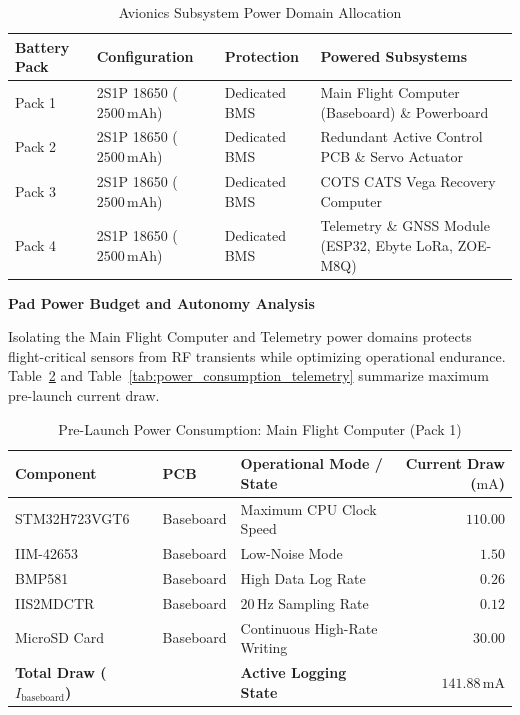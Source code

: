 \documentclass[11pt, a4paper]{article} %
\begin{document}
\begin{table}[H]
\centering
\caption{Avionics Subsystem Power Domain Allocation}
\label{tab:power_domains}
\begin{tabularx}{\textwidth}{l l l X}
\toprule
\textbf{Battery Pack} & \textbf{Configuration} & \textbf{Protection} & \textbf{Powered Subsystems} \\
\midrule
Pack 1 & 2S1P 18650 ($2500\,\text{mAh}$) & Dedicated BMS & Main Flight Computer (Baseboard) \& Powerboard \\
Pack 2 & 2S1P 18650 ($2500\,\text{mAh}$) & Dedicated BMS & Redundant Active Control PCB \& Servo Actuator \\
Pack 3 & 2S1P 18650 ($2500\,\text{mAh}$) & Dedicated BMS & COTS CATS Vega Recovery Computer \\
Pack 4 & 2S1P 18650 ($2500\,\text{mAh}$) & Dedicated BMS & Telemetry \& GNSS Module (ESP32, Ebyte LoRa, ZOE-M8Q) \\
\bottomrule
\end{tabularx}
\end{table}

\vspace{0.5em}
\noindent\textbf{Pad Power Budget and Autonomy Analysis}

Isolating the Main Flight Computer and Telemetry power domains protects flight-critical sensors from RF transients while optimizing operational endurance. Table~\ref{tab:power_consumption_baseboard} and Table~\ref{tab:power_consumption_telemetry} summarize maximum pre-launch current draw.

\begin{table}[H]
\centering
\caption{Pre-Launch Power Consumption: Main Flight Computer (Pack 1)}
\label{tab:power_consumption_baseboard}
\begin{tabularx}{\textwidth}{l l X r}
\toprule
\textbf{Component} & \textbf{PCB} & \textbf{Operational Mode / State} & \textbf{Current Draw ($\text{mA}$)} \\
\midrule
STM32H723VGT6 & Baseboard & Maximum CPU Clock Speed & $110.00$ \\
IIM-42653 & Baseboard & Low-Noise Mode & $1.50$ \\
BMP581 & Baseboard & High Data Log Rate & $0.26$ \\
IIS2MDCTR & Baseboard & $20\,\text{Hz}$ Sampling Rate & $0.12$ \\
MicroSD Card & Baseboard & Continuous High-Rate Writing & $30.00$ \\
\midrule
\textbf{Total Draw ($I_{\text{baseboard}}$)} & & \textbf{Active Logging State} & \textbf{$141.88\,\text{mA}$} \\
\bottomrule
\end{tabularx}
\end{table}
\end{document}
